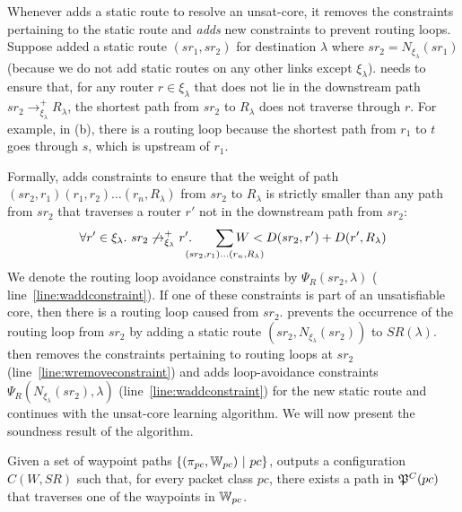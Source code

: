 Whenever \name adds a static route to resolve an unsat-core,
it removes the constraints pertaining to 
the static route and \emph{adds} new constraints to prevent
routing loops. 
Suppose \name added a static route $(sr_1, sr_2)$ for destination
$\lambda$ where $sr_2 = N_{\xi_\lambda}(sr_1)$ (because we do not add
static routes on any other links except $\xi_\lambda$). \name needs to
ensure that, for any router $r\in\xi_\lambda$ that does not 
lie in the downstream path $sr_2 \rightarrow^+_{\xi_\lambda} R_\lambda$, 
the shortest path from $sr_2$ to $R_\lambda$ does not traverse through 
$r$. For example, 
in (b), there is a routing loop because
 the shortest path from $r_1$ to $t$ goes through $s$, which is upstream of $r_1$. 

Formally, \name adds constraints to 
ensure that the weight
of path $(sr_2, r_1)(r_1, r_2)\ldots(r_n,R_\lambda)$
from $sr_2$ to $R_\lambda$ is 
strictly smaller than any path from $sr_2$ that traverses a
router $r'$ not in the downstream path from $sr_2$: 
\begin{equation} \label{eq:rla}
\forall r' \in \xi_\lambda. ~sr_2 \not\rightarrow_{\xi_\lambda}^+ r'. 
\hspace{0.6cm}\sum_{\mathclap{\substack{(sr_2, r_1)\ldots(r_n,R_\lambda)}}} 
W < D(sr_2, r') + D(r', R_\lambda) 
\end{equation}
We denote the routing loop avoidance 
constraints by $\Psi_R(sr_2, \lambda)$ 
( line~\ref{line:waddconstraint}). 
If one of these constraints is part of an unsatisfiable
core, then there is a routing 
loop caused from $sr_2$. 
\name 
prevents
the occurrence of the routing loop from $sr_2$
by adding a static route 
$(sr_2, N_{\xi_\lambda}(sr_2))$ to $SR(\lambda)$. 
\name then removes the constraints pertaining to routing
loops at $sr_2$ (line~\ref{line:wremoveconstraint}) and 
adds loop-avoidance constraints $\Psi_R(N_{\xi_\lambda}(sr_2), 
\lambda)$ (line~\ref{line:waddconstraint}) for the new static
route and continues with the unsat-core learning algorithm. We will
now present the soundness result of the algorithm. 

\iffull
\begin{theorem} \label{thm:wayptsr}
	Given a set of waypoint paths \linebreak
	$\{(\pi_{pc}, \mathbb{W}_{pc}) ~|~ pc\}$,
	 outputs a configuration $C(W,SR)$ 
	such that, for every packet class $pc$, 
	there exists a path in $\mathfrak{P}^C(pc)$ that
	traverses one of the waypoints in $\mathbb{W}_{pc}$.
\end{theorem}

\fi

